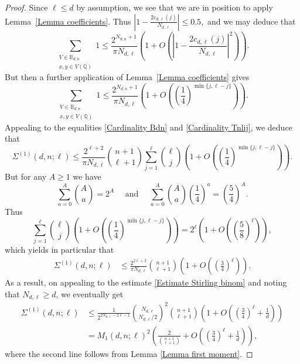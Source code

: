 \documentclass[10pt,a4paper]{amsart}
\renewcommand{\geq}{\geqslant}
\renewcommand{\leq}{\leqslant}
\begin{document}
\begin{proof}
Since  $\ell \leq d$ by assumption, we 
 see that we are in position to apply Lemma~\ref{Lemma coefficients}. 
Thus 
 $
 \left|
 1-\frac{2c_{d,\ell}(j)}{N_{d,\ell}}\right|\leq 0.5,
 $
and we may deduce that
 \begin{equation*}
\sum_{\substack{V \in \mathbb{B}_{d,n} \\ x, y \in V(\mathbb{Q})}} 1 \leq \frac{2^{N_{d,n}+1}}{\pi N_{d,\ell} } \left( 1+O\left(\left|
 1-\frac{2c_{d,\ell}(j)}{N_{d,\ell}}\right|^2\right)\right).
\end{equation*}
 But then a further  
application of   Lemma~\ref{Lemma coefficients} gives
\begin{equation*}
\sum_{\substack{V \in \mathbb{B}_{d,n} \\ x, y \in V(\mathbb{Q})}} 1 \leq \frac{2^{N_{d,n}+1}}{\pi N_{d,\ell}} \left( 1 + O \left( \left(\frac{1}{4} \right)^{\min \{ j, \ell-j \}} \right) \right).
\end{equation*}
Appealing to the equalities \eqref{Cardinality Bdn} and \eqref{Cardinality Tnlij}, we deduce that
\begin{equation*}
\Sigma^{(1)}(d,n;\ell) \leq \frac{2^{\ell+2}}{\pi N_{d,\ell}} \binom{n+1}{\ell+1} \sum_{j=1}^{\ell} \binom{\ell}{j} \left( 1 + O \left( \left(\frac{1}{4} \right)^{\min \{ j, \ell-j \}} \right) \right).
\end{equation*}
But for any $A\geq 1$ we have 
$$
\sum_{a=0}^A \binom{A}{a}=2^A \quad \text{ and } \quad 
\sum_{a=0}^A \binom{A}{a}\left(\frac{1}{4}\right)^a=\left(\frac{5}{4}\right)^A.
$$
Thus 
\begin{equation*}
\sum_{j=1}^{\ell} \binom{\ell}{j} \left( 1 + O \left( \left(\frac{1}{4} \right)^{\min \{ j, \ell-j \}} \right) \right)=
2^\ell \left(1+ O\left(\left(\frac{5}{8}\right)^\ell\right)\right),
\end{equation*}
which yields  in particular that
\begin{align*}
\Sigma^{(1)}(d,n;\ell) & \leq  \frac{2^{2\ell+2}}{\pi N_{d,\ell}} \binom{n+1}{\ell+1} \left( 1 + O\left(
\left(\frac{3}{4}\right)^\ell\right) \right).
\end{align*}
As a result, on appealing to the estimate \eqref{Estimate Stirling binom} and noting that $N_{d,\ell} \geq  d$, we eventually get
\begin{equation}
\label{Upper bound Sigma1}
\begin{split}
\Sigma^{(1)}(d,n;\ell) 
&\leq \frac1{2^{2N_{d,\ell}-2\ell-1}} \binom{N_{d,\ell}}{N_{d,\ell}/2}^2 \binom{n+1}{\ell+1} \left( 1 + O \left( \left(\frac{3}{4}\right)^\ell+\frac{1}{d}\right) \right)\\
&= M_1(d,n;\ell)^2 
\left( \frac{2}{\binom{n+1}{\ell+1}} + O \left( \left(\frac{3}{4}\right)^\ell+\frac{1}{d}\right) \right),
\end{split}
\end{equation}
where the second line follows from Lemma \ref{Lemma first moment}.


\end{proof}
\end{document}
